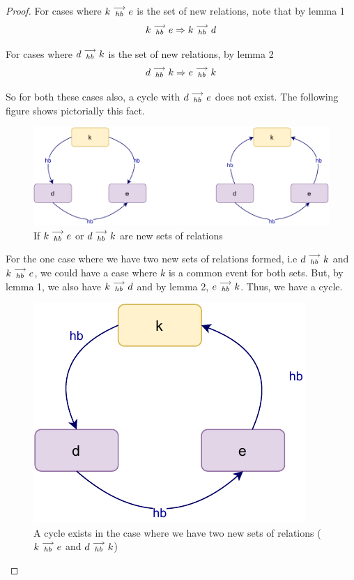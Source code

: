 \begin{proof}
        For cases where $k\stackrel{\longrightarrow}{_{hb}}e$ is the set of new relations, note that by lemma 1
        \[
            k\stackrel{\longrightarrow}{_{hb}}e \Rightarrow k\stackrel{\longrightarrow}{_{hb}}d
        \]
        
        
        For cases where $d\stackrel{\longrightarrow}{_{hb}}k$ is the set of new relations, by lemma 2
        \[
            d\stackrel{\longrightarrow}{_{hb}}k \Rightarrow e\stackrel{\longrightarrow}{_{hb}}k
        \]
        
        So for both these cases also, a cycle with $d\stackrel{\longrightarrow}{_{hb}}e$ does not exist. The following figure shows pictorially this fact. 
        
        \begin{figure}[H]
            \centering
            \includegraphics[scale=0.7]{Q4(a)_2.pdf}
            \caption{If $k\stackrel{\longrightarrow}{_{hb}}e$ or $d\stackrel{\longrightarrow}{_{hb}}k$ are new sets of relations}
            \label{fig:my_label}
        \end{figure}
        
        
        For the one case where we have two new sets of relations formed, i.e $d\stackrel{\longrightarrow}{_{hb}}k$ and $k\stackrel{\longrightarrow}{_{hb}}e$, we could have a case where $k$ is a common event for both sets. But, by lemma 1, we also have $k\stackrel{\longrightarrow}{_{hb}}d$ and by lemma 2, $e\stackrel{\longrightarrow}{_{hb}}k$. Thus, we have a cycle. 
        
        \begin{figure}[H]
            \centering
            \includegraphics[scale=0.7]{Q4(a)_3.pdf}
            \caption{A cycle exists in the case where we have two new sets of relations ($k\stackrel{\longrightarrow}{_{hb}}e$ and $d\stackrel{\longrightarrow}{_{hb}}k$) }
            \label{fig:my_label}
        \end{figure}
        

\end{proof}
